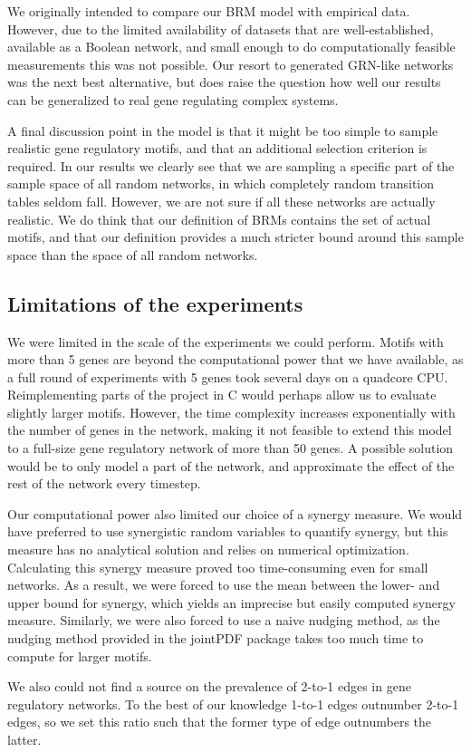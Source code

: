 \documentclass[../main.tex]{subfiles}
\begin{document}
We originally intended to compare our BRM model with empirical data.
However, due to the limited availability of datasets that are well-established, available as a Boolean network, and small enough to do computationally feasible measurements this was not possible.
Our resort to generated GRN-like networks was the next best alternative, but does raise the question how well our results can be generalized to real gene regulating complex systems.

A final discussion point in the model is that it might be too simple to sample realistic gene regulatory motifs, and that an additional selection criterion is required.
In our results we clearly see that we are sampling a specific part of the sample space of all random networks, in which completely random transition tables seldom fall.
However, we are not sure if all these networks are actually realistic.
We do think that our definition of BRMs contains the set of actual motifs, and that our definition provides a much stricter bound around this sample space than the space of all random networks.

\subsection{Limitations of the experiments}

We were limited in the scale of the experiments we could perform.
Motifs with more than 5 genes are beyond the computational power that we have available, as a full round of experiments with 5 genes took several days on a quadcore CPU. %
Reimplementing parts of the project in C would perhaps allow us to evaluate slightly larger motifs.
However, the time complexity increases exponentially with the number of genes in the network, making it not feasible to extend this model to a full-size gene regulatory network of more than 50 genes.
A possible solution would be to only model a part of the network, and approximate the effect of the rest of the network every timestep.

Our computational power also limited our choice of a synergy measure.
We would have preferred to use synergistic random variables to quantify synergy, but this measure has no analytical solution and relies on numerical optimization. 
Calculating this synergy measure proved too time-consuming even for small networks.
As a result, we were forced to use the mean between the lower- and upper bound for synergy, which yields an imprecise but easily computed synergy measure.
Similarly, we were also forced to use a naive nudging method, as the nudging method provided in the jointPDF package takes too much time to compute for larger motifs.

We also could not find a source on the prevalence of 2-to-1 edges in gene regulatory networks.
To the best of our knowledge 1-to-1 edges outnumber 2-to-1 edges, so we set this ratio such that the former type of edge outnumbers the latter.
\end{document}
